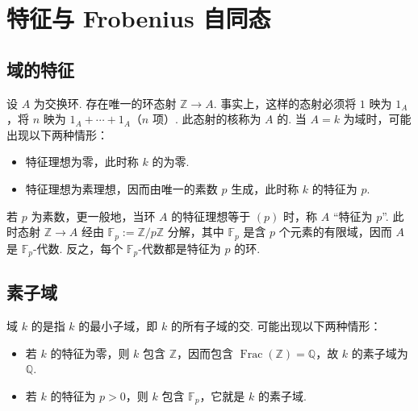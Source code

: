 \section{特征与 Frobenius 自同态}\label{sec:galois-2-4}
\subsection{域的特征}\label{sec:galois-2-4-1}
设 $A$ 为交换环. 存在唯一的环态射 $\mathbb Z\longrightarrow A$. 事实上，这样的态射必须将 $1$ 映为 $1_A$，将 $n$ 映为 $1_A+\cdots+1_A$（$n$ 项）. 此态射的核称为 $A$ 的. 当 $A=k$ 为域时，可能出现以下两种情形：
\begin{itemize}
\item 特征理想为零，此时称 $k$ 的为零.
\item 特征理想为素理想，因而由唯一的素数 $p$ 生成，此时称 $k$ 的特征为 $p$.
\end{itemize}
\begin{remark*}
若 $p$ 为素数，更一般地，当环 $A$ 的特征理想等于 $(p)$ 时，称 $A$ ``特征为 $p$''. 此时态射 $\mathbb Z\longrightarrow A$ 经由 $\mathbb F_p:=\mathbb Z/p\mathbb Z$ 分解，其中 $\mathbb F_p$ 是含 $p$ 个元素的有限域，因而 $A$ 是 $\mathbb F_p$-代数. 反之，每个 $\mathbb F_p$-代数都是特征为 $p$ 的环.
\end{remark*}
\subsection{素子域}\label{sec:galois-2-4-2}
域 $k$ 的是指 $k$ 的最小子域，即 $k$ 的所有子域的交. 可能出现以下两种情形：
\begin{itemize}
\item 若 $k$ 的特征为零，则 $k$ 包含 $\mathbb Z$，因而包含 $\operatorname{Frac}(\mathbb Z)=\mathbb Q$，故 $k$ 的素子域为 $\mathbb Q$.
\item 若 $k$ 的特征为 $p>0$，则 $k$ 包含 $\mathbb F_p$，它就是 $k$ 的素子域.
\end{itemize}
